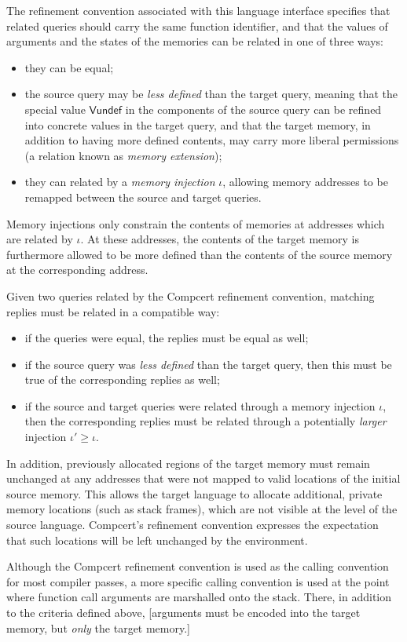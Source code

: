 \documentclass[sigplan,10pt,review,anonymous]{acmart}
\newcommand{\kw}[1]{\ensuremath{ \textsf{#1} }}
\begin{document}
The refinement convention associated with this language interface
specifies that
related queries should carry the same function identifier,
and that the values of arguments and the states of the memories
can be related in one of three ways:
\begin{itemize}
\item they can be equal;
\item the source query may be
  \emph{less defined} than the target query,
  meaning that the special value $\kw{Vundef}$
  in the components of the source query
  can be refined into concrete values in the target query,
  and that the target memory,
  in addition to having more defined contents,
  may carry more liberal permissions
  (a relation known as \emph{memory extension});
\item they can related by a \emph{memory injection} $\iota$,
  allowing memory addresses to be remapped
  between the source and target queries.
\end{itemize}
Memory injections only constrain the contents of memories
at addresses which are related by $\iota$.
At these addresses,
the contents of the target memory is furthermore
allowed to be more defined than the contents of the source
memory at the corresponding address.

Given two queries related by
the Compcert refinement convention,
matching replies
must be related in a compatible way:
\begin{itemize}
\item if the queries were equal,
  the replies must be equal as well;
\item if the source query was
  \emph{less defined} than the target query,
  then this must be true of the corresponding
  replies as well;
\item if the source and target queries
  were related through a memory injection $\iota$,
  then the corresponding replies
  must be related through a potentially \emph{larger}
  injection $\iota' \ge \iota$.
\end{itemize}
In addition,
previously allocated regions of the target memory
must remain unchanged
at any addresses that were not mapped to valid locations
of the initial source memory.
This allows the target language to allocate additional,
private memory locations (such as stack frames),
which are not visible at the level of the source language.
Compcert's refinement convention
expresses the expectation that such locations
will be left unchanged by the environment.

Although the Compcert refinement convention is used as
the calling convention for most compiler passes,
a more specific calling convention is used
at the point where function call arguments
are marshalled onto the stack.
There,
in addition to the criteria defined above,
[arguments must be encoded into the target memory,
but \emph{only} the target memory.]
\end{document}
